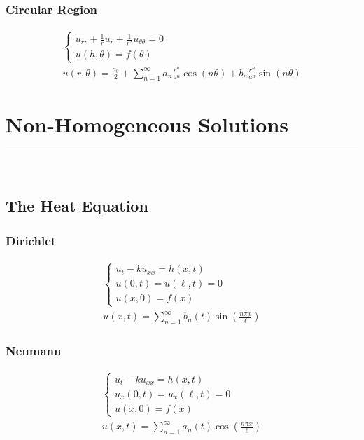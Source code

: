 \documentclass{article}
\begin{document}
\subsubsection*{Circular Region}
\begin{gather*}
\begin{cases}
u_{rr} + \frac{1}{r}u_{r} + \frac{1}{r^{2}}u_{\theta\theta} = 0\\
u(h,\theta)  = f(\theta)
\end{cases}\\
u(r,\theta) = \frac{a_{0}}{2} + \sum_{n=1}^{\infty}a_{n}\frac{r^{n}}{a^{n}}\cos{(n\theta)} + b_{n}\frac{r^{n}}{a^{n}}\sin{(n\theta)}
\end{gather*}
\newpage




\section{Non-Homogeneous Solutions}
\hrule
\noindent\\
\subsection{The Heat Equation}
\begin{minipage}{0.5\textwidth}
\subsubsection*{Dirichlet}
\begin{gather*}
\begin{cases}
u_{t} - ku_{xx} = h(x,t)\\
u(0,t) = u(\ell,t) = 0\\
u(x,0) = f(x)
\end{cases}\\
u(x,t) = \sum_{n=1}^{\infty}b_{n}(t)\sin{\left(\frac{n\pi x}{\ell}\right)}
\end{gather*}
\end{minipage}
\begin{minipage}{0.5\textwidth}
\subsubsection*{Neumann}
\begin{gather*}
\begin{cases}
u_{t} - ku_{xx} = h(x,t)\\
u_{x}(0,t) = u_{x}(\ell,t) = 0\\
u(x,0) = f(x)
\end{cases}\\
u(x,t) = \sum_{n=1}^{\infty}a_{n}(t)\cos{\left(\frac{n\pi x}{\ell}\right)}
\end{gather*}
\end{minipage}
\end{document}

